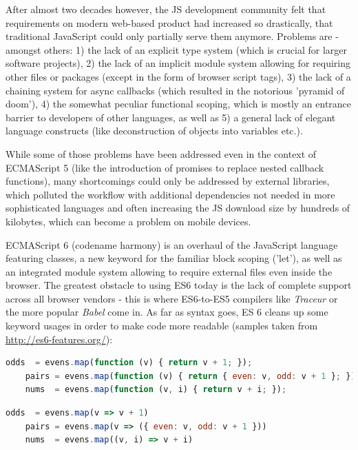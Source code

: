 		After almost two decades however, the JS development community felt that requirements on modern web-based product had increased so drastically, that traditional JavaScript could only partially serve them anymore. Problems are - amongst others: 1) the lack of an explicit type system (which is crucial for larger software projects), 2) the lack of an implicit module system allowing for requiring other files or packages (except in the form of browser script tags), 3) the lack of a chaining system for async callbacks (which resulted in the notorious 'pyramid of doom'), 4) the somewhat peculiar functional scoping, which is mostly an entrance barrier to developers of other languages, as well as 5) a general lack of elegant language constructs (like deconstruction of objects into variables etc.).
		
		While some of those problems have been addressed even in the context of ECMAScript 5 (like the introduction of promises to replace nested callback functions), many shortcomings could only be addressed by external libraries, which polluted the workflow with additional dependencies not needed in more sophisticated languages and often increasing the JS download size by hundreds of kilobytes, which can become a problem on mobile devices.
		
		ECMAScript 6 (codename harmony) is an overhaul of the JavaScript language featuring classes, a new keyword for the familiar block scoping ('let'), as well as an integrated module system allowing to require external files even inside the browser. The greatest obstacle to using ES6 today is the lack of complete support across all browser vendors - this is where ES6-to-ES5 compilers like \textit{Traceur} or the more popular \textit{Babel} come in. As far as syntax goes, ES 6 cleans up some keyword usages in order to make code more readable (samples taken from \url{http://es6-features.org/}):
		
		
		\begin{lstlisting}[caption={ECMAScript 5 (usually referred to as 'JavaScript') version of functional programming using the natively built-in mapping function.}, label={fig:ECMAScript5_mapping}, language=JavaScript]
	odds  = evens.map(function (v) { return v + 1; });
	pairs = evens.map(function (v) { return { even: v, odd: v + 1 }; });
	nums  = evens.map(function (v, i) { return v + i; });
		\end{lstlisting}
		
		
		\begin{lstlisting}[caption={ECMAScript 6 equivalent to the above code.}, label={fig:ECMAScript6_mapping}, language=JavaScript]
	odds  = evens.map(v => v + 1)
	pairs = evens.map(v => ({ even: v, odd: v + 1 }))
	nums  = evens.map((v, i) => v + i)
		\end{lstlisting}
		
